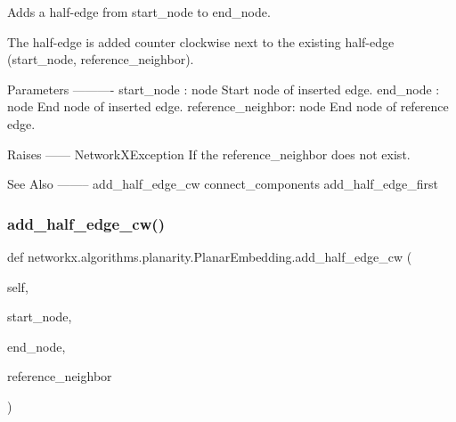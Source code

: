 \begin{DoxyVerb}Adds a half-edge from start_node to end_node.

The half-edge is added counter clockwise next to the existing half-edge
(start_node, reference_neighbor).

Parameters
----------
start_node : node
    Start node of inserted edge.
end_node : node
    End node of inserted edge.
reference_neighbor: node
    End node of reference edge.

Raises
------
NetworkXException
    If the reference_neighbor does not exist.

See Also
--------
add_half_edge_cw
connect_components
add_half_edge_first\end{DoxyVerb}
 \mbox{\label{classnetworkx_1_1algorithms_1_1planarity_1_1PlanarEmbedding_a7076b5d10c8076b752010b799d49acc6}} 
\subsubsection{\texorpdfstring{add\+\_\+half\+\_\+edge\+\_\+cw()}{add\_half\_edge\_cw()}}
{\footnotesize\ttfamily def networkx.\+algorithms.\+planarity.\+Planar\+Embedding.\+add\+\_\+half\+\_\+edge\+\_\+cw (\begin{DoxyParamCaption}\item[{}]{self,  }\item[{}]{start\+\_\+node,  }\item[{}]{end\+\_\+node,  }\item[{}]{reference\+\_\+neighbor }\end{DoxyParamCaption})}

